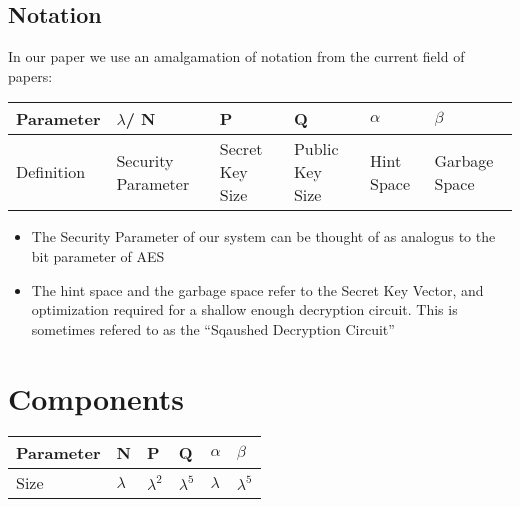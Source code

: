\documentclass[letterpaper,11pt]{article} %
\begin{document}
\subsection{Notation}
In our paper we use an amalgamation of notation from the current field of papers:


\begin{center}
\begin{tabular}{ l | l | l | l | l | l }
\hline
Parameter & $\lambda$/ N & P & Q & $\alpha$ & $\beta$ \\ \hline
Definition & Security Parameter & Secret Key Size   & Public Key Size & Hint Space & Garbage Space  \\ \hline
\end{tabular}
\end{center}

\begin{itemize}
\item The Security Parameter of our system  can be thought of as analogus to the bit parameter of AES
\item The hint space and the garbage space refer to the Secret Key Vector, and optimization required for a shallow enough decryption circuit. This is sometimes refered to as the ``Sqaushed Decryption Circuit'' 
\end{itemize}

\section*{Components}
% 
%

\begin{center}
\begin{tabular}{  l | l | l | l | l | l }
\hline
Parameter & N & P & Q & $\alpha$ & $\beta$ \\ \hline
Size &  $\lambda$ & $\lambda ^2$  & $\lambda ^5$ & $\lambda$ & $\lambda ^5$  \\ \hline
\end{tabular}
\end{center}
\end{document}
